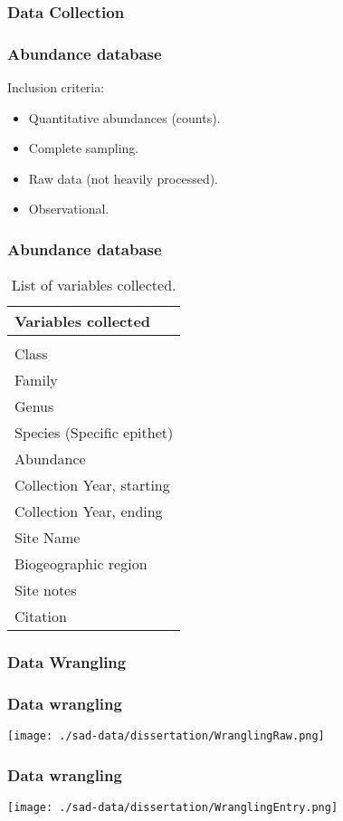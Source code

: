 \documentclass[14pt]{beamer}
\begin{document}
\subsubsection{Data Collection}
\begin{frame}[t]{}
\frametitle{Abundance database}
Inclusion criteria:
\begin{itemize}
\item Quantitative abundances (counts).
\item Complete sampling.
\item Raw data (not heavily processed).
\item Observational.
\end{itemize}
\end{frame}

\begin{frame}[shrink=30]
\frametitle{Abundance database}
\begin{table}
\begin{tabular}{l} 
 Variables collected\\ 
\hline
\\
 Class \\
 Family\\
 Genus \\
 Species (Specific epithet)\\
 Abundance \\
 Collection Year, starting\\
 Collection Year, ending \\
 Site Name \\
 Biogeographic region \\
 Site notes\\
 Citation\\ 
\end{tabular}
\caption{List of variables collected.}
\end{table}
\end{frame}

\subsubsection{Data Wrangling}
\begin{frame}[t]
\frametitle{Data wrangling}
\begin{center}
\texttt{[image: ./sad-data/dissertation/WranglingRaw.png]}
\end{center}
\end{frame}

\begin{frame}[t]
\frametitle{Data wrangling}
\begin{center}
\texttt{[image: ./sad-data/dissertation/WranglingEntry.png]}
\end{center}
\end{frame}
\end{document}
